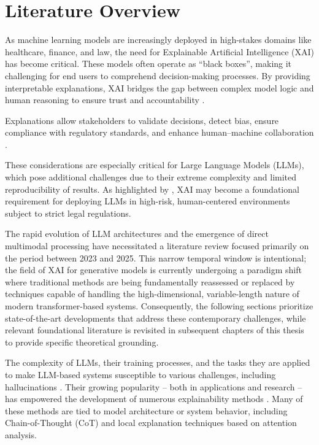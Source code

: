 \chapter{Literature Overview}
\label{sec:literature}

As machine learning models are increasingly deployed in high-stakes domains like healthcare, finance, and law, the need for Explainable Artificial Intelligence (XAI) has become critical. These models often operate as ``black boxes'', making it challenging for end users to comprehend decision-making processes. By providing interpretable explanations, XAI bridges the gap between complex model logic and human reasoning to ensure trust and accountability \parencite{explainableaihistory}.

Explanations allow stakeholders to validate decisions, detect bias, ensure compliance with regulatory standards, and enhance human–machine collaboration \parencite{explainableaihistory}.

These considerations are especially critical for Large Language Models (LLMs), which pose additional challenges due to their extreme complexity and limited reproducibility of results. As highlighted by \textcite{herrera2025makingsenseunsensiblereflection}, XAI may become a foundational requirement for deploying LLMs in high-risk, human-centered environments subject to strict legal regulations.

The rapid evolution of LLM architectures and the emergence of direct multimodal processing have necessitated a literature review focused primarily on the period between 2023 and 2025. This narrow temporal window is intentional; the field of XAI for generative models is currently undergoing a paradigm shift where traditional methods are being fundamentally reassessed or replaced by techniques capable of handling the high-dimensional, variable-length nature of modern transformer-based systems. Consequently, the following sections prioritize state-of-the-art developments that address these contemporary challenges, while relevant foundational literature is revisited in subsequent chapters of this thesis to provide specific theoretical grounding.

The complexity of LLMs, their training processes, and the tasks they are applied to make LLM-based systems susceptible to various challenges, including hallucinations \parencite{Huang2025}. Their growing popularity -- both in applications and research -- has empowered the development of numerous explainability methods \parencite{zhao2023explainabilitylargelanguagemodels}. Many of these methods are tied to model architecture or system behavior, including Chain-of-Thought (CoT) and local explanation techniques based on attention analysis.

